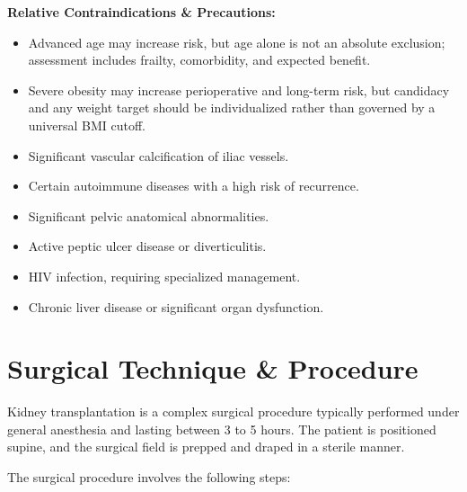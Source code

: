 \textbf{Relative Contraindications \& Precautions:}
\begin{itemize}
  \item Advanced age may increase risk, but age alone is not an absolute exclusion; assessment includes frailty, comorbidity, and expected benefit.
  \item Severe obesity may increase perioperative and long-term risk, but candidacy and any weight target should be individualized rather than governed by a universal BMI cutoff.
  \item Significant vascular calcification of iliac vessels.
  \item Certain autoimmune diseases with a high risk of recurrence.
  \item Significant pelvic anatomical abnormalities.
  \item Active peptic ulcer disease or diverticulitis.
  \item HIV infection, requiring specialized management.
  \item Chronic liver disease or significant organ dysfunction.
\end{itemize}

\section*{Surgical Technique \& Procedure}
Kidney transplantation is a complex surgical procedure typically performed under general anesthesia and lasting between 3 to 5 hours. The patient is positioned supine, and the surgical field is prepped and draped in a sterile manner.

The surgical procedure involves the following steps:

